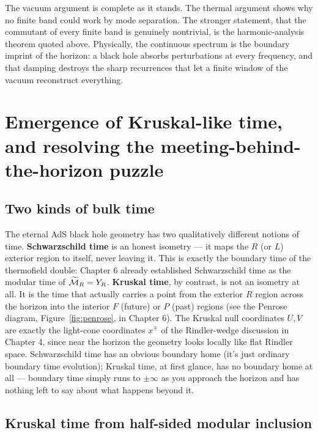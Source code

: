 The vacuum argument is complete as it stands. The thermal argument shows why no finite band could work by
mode separation. The stronger statement, that the commutant of every finite band is genuinely nontrivial, is
the harmonic-analysis theorem quoted above. Physically, the continuous spectrum is the boundary imprint of the
horizon: a black hole absorbs perturbations at every frequency, and that damping destroys the sharp
recurrences that let a finite window of the vacuum reconstruct everything.

\section{Emergence of Kruskal-like time, and resolving the meeting-behind-the-horizon puzzle}

\subsection*{Two kinds of bulk time}

The eternal AdS black hole geometry has two qualitatively different notions of time. \textbf{Schwarzschild
time} is an honest isometry — it maps the $R$ (or $L$) exterior region to itself, never leaving it. This is
exactly the boundary time of the thermofield double: Chapter 6 already established
Schwarzschild time as the modular time of $\widetilde{\mathcal{M}}_R=Y_R$. \textbf{Kruskal time}, by contrast, is not an
isometry at all. It is the time that actually carries a point from the exterior $R$ region across the horizon
into the interior $F$ (future) or $P$ (past) regions (see the Penrose diagram, Figure~\ref{fig:penrose}, in
Chapter 6). The Kruskal null coordinates $U,V$ are exactly the light-cone coordinates $x^\mp$ of the
Rindler-wedge discussion in Chapter 4, since near the horizon the geometry looks locally like flat Rindler
space. Schwarzschild time has an obvious boundary home
(it's just ordinary boundary time evolution); Kruskal time, at first glance, has no boundary home at all —
boundary time simply runs to $\pm\infty$ as you approach the horizon and has nothing left to say about what
happens beyond it.

\subsection*{Kruskal time from half-sided modular inclusion}

